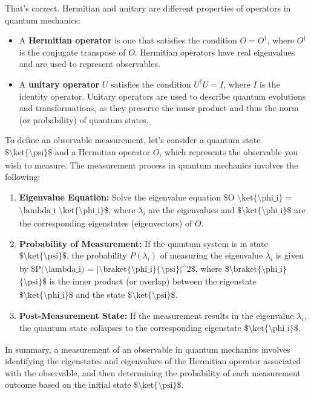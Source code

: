 \begin{airesult}
That's correct. Hermitian and unitary are different properties of operators in quantum mechanics:

\begin{itemize}
  \item A \textbf{Hermitian operator} is one that satisfies the condition \( O = O^\dagger \), where
\( O^\dagger \) is the conjugate transpose of \( O \). Hermitian operators have real eigenvalues and
are used to represent observables.
  \item A \textbf{unitary operator} \( U \) satisfies the condition \( U^\dagger U = I \), where \(
I \) is the identity operator. Unitary operators are used to describe quantum evolutions and
transformations, as they preserve the inner product and thus the norm (or probability) of quantum
states.
\end{itemize}

\vsp

To define an observable measurement, let's consider a quantum state \( \ket{\psi} \) and a Hermitian
operator \( O \), which represents the observable you wish to measure. The measurement process in
quantum mechanics involves the following:

\begin{enumerate}
  \item \textbf{Eigenvalue Equation:} Solve the eigenvalue equation \( O \ket{\phi_i} = \lambda_i
\ket{\phi_i} \), where \( \lambda_i \) are the eigenvalues and \( \ket{\phi_i} \) are the
corresponding eigenstates (eigenvectors) of \( O \).

  \item \textbf{Probability of Measurement:} If the quantum system is in state \( \ket{\psi} \), the
probability \( P(\lambda_i) \) of measuring the eigenvalue \( \lambda_i \) is given by \(
P(\lambda_i) = |\braket{\phi_i}{\psi}|^2 \), where \( \braket{\phi_i}{\psi} \) is the inner product
(or overlap) between the eigenstate \( \ket{\phi_i} \) and the state \( \ket{\psi} \).

  \item \textbf{Post-Measurement State:} If the measurement results in the eigenvalue \( \lambda_i
\), the quantum state collapses to the corresponding eigenstate \( \ket{\phi_i} \).
\end{enumerate}

\vsp

In summary, a measurement of an observable in quantum mechanics involves identifying the eigenstates
and eigenvalues of the Hermitian operator associated with the observable, and then determining the
probability of each measurement outcome based on the initial state \( \ket{\psi} \).
\end{airesult}

